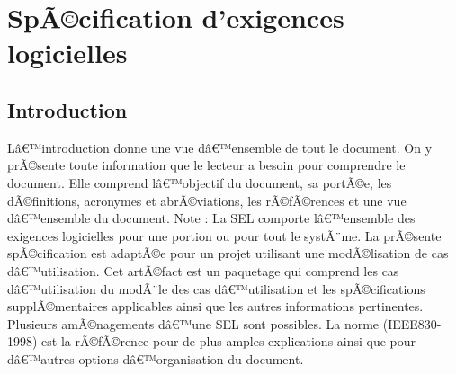 \documentclass[a4paper, french, 10pt]{report}
\begin{document}
\chapter{SpÃ©cification d'exigences logicielles}


\section{Introduction}
Lâ€™introduction donne une vue dâ€™ensemble de tout le document. On y prÃ©sente toute information que le lecteur a besoin pour  comprendre le document. Elle comprend lâ€™objectif du document, sa portÃ©e, les dÃ©finitions, acronymes et abrÃ©viations, les rÃ©fÃ©rences et une vue dâ€™ensemble du document.
Note : La SEL comporte lâ€™ensemble des exigences logicielles pour une portion ou pour tout le systÃ¨me. La prÃ©sente spÃ©cification est adaptÃ©e pour  un projet utilisant une modÃ©lisation de cas dâ€™utilisation. Cet artÃ©fact est un paquetage qui comprend les cas dâ€™utilisation du modÃ¨le des cas dâ€™utilisation et les spÃ©cifications supplÃ©mentaires applicables ainsi que les autres informations pertinentes.
Plusieurs amÃ©nagements dâ€™une SEL sont possibles. La norme (IEEE830-1998) est la rÃ©fÃ©rence pour de plus amples explications ainsi que pour dâ€™autres options dâ€™organisation du document.
\end{document}
